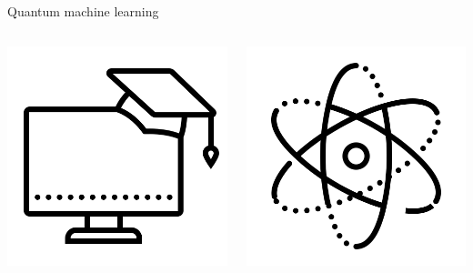 \documentclass{beamer}
\begin{document}
    \begin{frame}{Quantum machine learning}
        \begin{columns}
            \begin{center}
                \includegraphics[width=.8\columnwidth]{gfx/icons/icons8-machine-learning-480.png}                
            \end{center}
            \begin{center}
                \includegraphics[width=.8\columnwidth]{gfx/icons/icons8-physics-480.png}                

\end{center}
\end{columns}
\end{frame}
\end{document}
